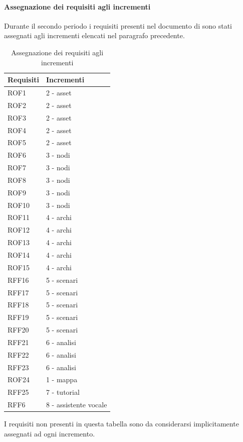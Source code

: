 		\paragraph{Assegnazione dei requisiti agli incrementi}
		Durante il secondo periodo i requisiti presenti nel documento di \adr sono stati assegnati agli incrementi elencati nel paragrafo precedente.
			\begin{table}[H]
				\centering
				\begin{tabular}{ll}
					\toprule
					\textbf{Requisiti}                           & \textbf{Incrementi}              \\
					\midrule
					ROF1 & 2 - asset \\
					ROF2 & 2 - asset \\
					ROF3 & 2 - asset \\
					ROF4 & 2 - asset \\
					ROF5 & 2 - asset \\
					\midrule
					ROF6 & 3 - nodi \\
					ROF7 & 3 - nodi \\
					ROF8 & 3 - nodi \\
					ROF9 & 3 - nodi \\
					ROF10 & 3 - nodi \\
					\midrule
					ROF11 & 4 - archi \\
					ROF12 & 4 - archi \\
					ROF13 & 4 - archi \\
					ROF14 & 4 - archi \\
					ROF15 & 4 - archi \\
					\midrule
					RFF16 & 5 - scenari \\
					RFF17 & 5 - scenari \\
					RFF18 & 5 - scenari \\
					RFF19 & 5 - scenari \\
					RFF20 & 5 - scenari \\
					\midrule
					RFF21 & 6 - analisi \\
					RFF22 & 6 - analisi \\
					RFF23 & 6 - analisi \\
					\midrule
					ROF24 & 1 - mappa \\
					\midrule
					RFF25 & 7 - tutorial \\
					\midrule
					RFF6  & 8 - assistente vocale \\
					\bottomrule
				\end{tabular}
				\caption{Assegnazione dei requisiti agli incrementi}
			\end{table}
		I requisiti non presenti in questa tabella sono da considerarsi implicitamente assegnati ad ogni incremento.
